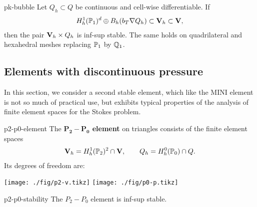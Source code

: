 \begin{Corollary}{pk-bubble}
  Let $Q_h\subset Q$ be continuous and cell-wise differentiable. If
  \begin{gather}
    H^1_h(\P_1)^d\oplus B_h(b_\cell\nabla Q_h) \subset \vV_h \subset \vV,
  \end{gather}
  then the pair $\vV_h\times Q_h$ is inf-sup stable. The same holds on
  quadrilateral and hexahedral meshes replacing $\P_1$ by $\Q_1$.
\end{Corollary}

\subsection{Elements with discontinuous pressure}

\begin{intro}
  In this section, we consider a second stable element, which like
  the MINI element is not so much of practical use, but exhibits
  typical properties of the analysis of finite element spaces for the
  Stokes problem.
\end{intro}

\begin{Definition}{p2-p0-element}
  The \textbf{$\mathbf{P_2-P_0}$ element} on triangles consists of the finite
  element spaces
  \begin{gather}
    \vV_h = H^1_h(\P_2)^2 \cap \vV,
    \qquad
    Q_h = H^0_h(\P_0) \cap Q.
  \end{gather}
  Its degrees of freedom are:
    \begin{center}
    \texttt{[image: ./fig/p2-v.tikz]}
    \hspace{1cm}
    \texttt{[image: ./fig/p0-p.tikz]}
  \end{center}
\end{Definition}

\begin{Lemma}{p2-p0-stability}
  The $P_2-P_0$ element is inf-sup stable.
\end{Lemma}

